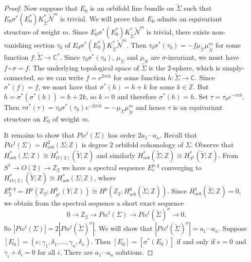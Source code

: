 \documentclass{amsart}
\theoremstyle{definition}
\theoremstyle{remark}
\numberwithin{equation}{section}
\begin{document}
\begin{proof}
Now suppose that $E_0$ is an orbifold line bundle on $\widetilde{\Sigma}$ such that $E_0 \sigma^*(E_0^*) K_{\widetilde{\Sigma}}^* \widetilde{N}^m$ is trivial. We will prove that $E_0$ admits an equivariant structure of weight $m$. Since $E_0 \sigma^*(E_0^*) K_{\widetilde{\Sigma}}^* \widetilde{N}^m$ is trivial, there exists non-vanishing section $\tau_0$ of $E_0 \sigma^*(E_0^*) K_{\widetilde{\Sigma}}^* \widetilde{N}^m$. Then $\tau_0 \sigma^*(\tau_0) = - f \mu_{\widetilde{\Sigma}} \mu_{\widetilde{N}}^m$ for some function $f :  \widetilde{\Sigma} \to \mathbb{C}^*$. Since $\tau_0 \sigma^*(\tau_0)$, $\mu_{\widetilde{\Sigma}}$ and $\mu_{\widetilde{N}}$ are $\sigma$-invariant, we must have $f \circ \sigma = f$. The underlying topological space of $\widetilde{\Sigma}$ is the $2$-sphere, which is simply-connected, so we can write $f = e^{2\pi i h}$ for some function $h : \widetilde{\Sigma} \to \mathbb{C}$. Since $\sigma^*(f) = f$, we must have that $\sigma^*(h) = h + k$ for some $k \in \mathbb{Z}$. But $h = \sigma^*(\sigma^*(h)) = h + 2k$, so $k=0$ and therefore $\sigma^*(h) = h$. Set $\tau = \tau_0 e^{-\pi i h}$. Then $\tau \sigma^*(\tau) = \tau_0 \sigma^*(\tau_0) e^{-2\pi i h} = -\mu_{\widetilde{\Sigma}} \mu_{\widetilde{N}}^m$ and hence $\tau$ is an equivariant structure on $E_0$ of weight $m$.

It remains to show that $Pic^t(\Sigma)$ has order $2a_1 \cdots a_n$. Recall that $Pic^t(\Sigma) = H^2_{orb}( \Sigma ; \mathbb{Z})$ is degree $2$ orbifold cohomology of $\Sigma$. Observe that $H^*_{orb}(\Sigma ; \mathbb{Z}) \cong H^*_{O(2)}( \widetilde{Y} ; \mathbb{Z})$ and similarly $H^*_{orb}(\widetilde{\Sigma} ; \mathbb{Z}) \cong H^*_{S^1}(\widetilde{Y} ; \mathbb{Z})$. From $S^1 \to O(2) \to \mathbb{Z}_2$ we have a spectral sequence $E_r^{p,q}$ converging to $H^*_{O(2)}(\widetilde{Y} ; \mathbb{Z}) \cong H^*_{orb}(\Sigma ; \mathbb{Z})$, where $E^{p,q}_2 = H^p( \mathbb{Z}_2 ; H^q_{S^1}(Y ; \mathbb{Z}) ) \cong H^p(\mathbb{Z}_2 ; H^q_{orb}(\widetilde{\Sigma} ; \mathbb{Z}))$. Since $H^1_{orb}(\widetilde{\Sigma} ; \mathbb{Z}) = 0$, we obtain from the spectral sequence a short exact sequence
\[
0 \to \mathbb{Z}_2 \to Pic^t(\Sigma) \to Pic^t(\widetilde{\Sigma})^{\sigma} \to 0.
\]
So $|Pic^t(\Sigma)| = 2 |Pic^t(\widetilde{\Sigma})^{\sigma}|$. We will show that $| Pic^t(\widetilde{\Sigma})^{\sigma} | = a_1 \cdots a_n$. Suppose $[E_0] = (e ; \gamma_1 , \delta_1 , \dots , \gamma_n , \delta_n)$. Then $[E_0] = [\sigma^*(E_0)]$ if and only if $e = 0$ and $\gamma_i + \delta_i = 0$ for all $i$. There are $a_1 \cdots a_n$ solutions.
\end{proof}
\end{document}
